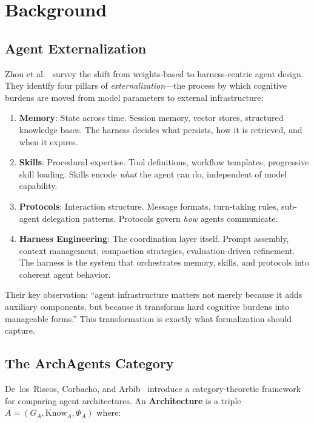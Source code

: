 \section{Background}\label{sec:background}

\subsection{Agent Externalization}

Zhou et al.~\cite{zhou2026externalization} survey the shift from weights-based to harness-centric agent design. They identify four pillars of \emph{externalization}---the process by which cognitive burdens are moved from model parameters to external infrastructure:

\begin{enumerate}[leftmargin=*]
\item \textbf{Memory}: State across time. Session memory, vector stores, structured knowledge bases. The harness decides what persists, how it is retrieved, and when it expires.
\item \textbf{Skills}: Procedural expertise. Tool definitions, workflow templates, progressive skill loading. Skills encode \emph{what} the agent can do, independent of model capability.
\item \textbf{Protocols}: Interaction structure. Message formats, turn-taking rules, sub-agent delegation patterns. Protocols govern \emph{how} agents communicate.
\item \textbf{Harness Engineering}: The coordination layer itself. Prompt assembly, context management, compaction strategies, evaluation-driven refinement. The harness is the system that orchestrates memory, skills, and protocols into coherent agent behavior.
\end{enumerate}

Their key observation: ``agent infrastructure matters not merely because it adds auxiliary components, but because it transforms hard cognitive burdens into manageable forms.'' This transformation is exactly what formalization should capture.

\subsection{The ArchAgents Category}

De~los~Riscos, Corbacho, and Arbib~\cite{delosriscos2026categorical} introduce a category-theoretic framework for comparing agent architectures. An \textbf{Architecture} is a triple $A = (G_A, \mathrm{Know}_A, \Phi_A)$ where:

